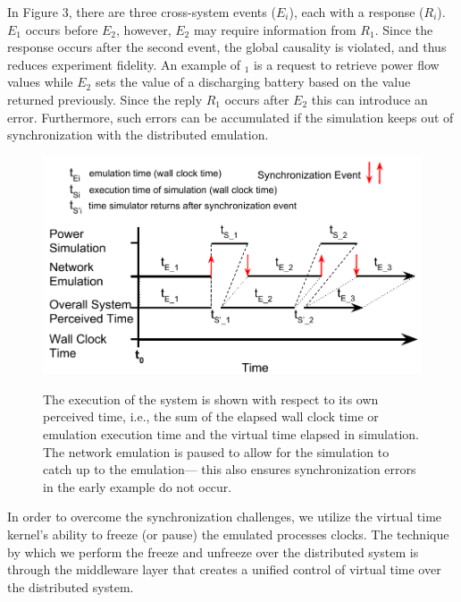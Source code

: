In Figure 3, there are three cross-system events ($E_i$), each
with a response ($R_i$). $E_1$ occurs before $E_2$, however, $E_2$ may
require information from $R_1$. Since the response occurs after
the second event, the global causality is violated, and thus
reduces experiment fidelity. An example of $_1$ is a request
to retrieve power flow values while $E_2$ sets the value of a
discharging battery based on the value returned previously.
Since the reply $R_1$ occurs after $E_2$ this can introduce an
error. Furthermore, such errors can be accumulated if the
simulation keeps out of synchronization with the distributed emulation.

\begin{figure}
  \centering
  \includegraphics[scale=0.5]{wall_clock.pdf}
  \label{sim-err}

  \caption{
    The execution of the system is shown with respect
    to its own perceived time, i.e., the sum of the elapsed wall clock time or emulation
    execution time and the virtual time elapsed in simulation. The network emulation is paused
    to allow for the simulation to catch up to the emulation—
    this also ensures synchronization errors in the early example
    do not occur.
  }
\end{figure}

In order to overcome the synchronization challenges, we utilize the virtual time kernel's ability to freeze (or pause) the emulated processes clocks. The technique by which we perform the freeze and unfreeze over the distributed system is through the middleware layer that creates a unified control of virtual time over the distributed system.

